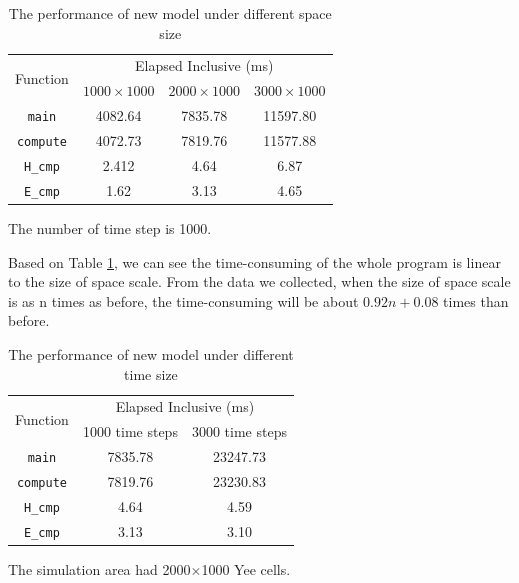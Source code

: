 \begin{table}[hp]
	\centering
	\begin{threeparttable}
	\caption{The performance of new model under different space size}\label{ch3: new, size}
		\begin{tabular}{cccc}
			\toprule
			\multirow{2}{3em}{Function}&\multicolumn{3}{c}{Elapsed Inclusive (ms)}\\ 
			\cline{2-4}
			& $1000\times1000$ & $2000\times1000$ & $3000\times1000$\\ 
			
			\midrule
			\lstinline|main| & 4082.64 & 7835.78 & 11597.80 \\ 
			\lstinline|compute| & 4072.73 & 7819.76 & 11577.88\\ 
			\lstinline|H_cmp|& 2.412 & 4.64 & 6.87\\ 
			\lstinline|E_cmp|& 1.62 & 3.13 & 4.65 \\
			\bottomrule
		\end{tabular}
		\begin{tablenotes}
			\item[1] The number of time step is 1000.
		\end{tablenotes}
	\end{threeparttable}
\end{table}

Based on Table \ref{ch3: new, size}, we can see the time-consuming of the whole program is linear to the size of space scale. From the data we collected, when the size of space scale is as n times as before, the time-consuming will be about $0.92n+0.08$ times than before.

\begin{table}[hp]
	\centering
	\begin{threeparttable}
		\caption{The performance of new model under different time size}\label{ch3: new, time}
		\begin{tabular}{ccc}
			\toprule
			\multirow{2}{3em}{Function}&\multicolumn{2}{c}{Elapsed Inclusive (ms)}\\ 
			\cline{2-3}
			& 1000 time steps & 3000 time steps\\ 
			
			\midrule
			\lstinline|main| & 7835.78 & 23247.73 \\ 
			\lstinline|compute| & 7819.76 & 23230.83\\ 
			\lstinline|H_cmp|& 4.64 & 4.59\\ 
			\lstinline|E_cmp|& 3.13 & 3.10\\
			\bottomrule
		\end{tabular}
		\begin{tablenotes}
			\item[1] The simulation area had 2000$\times$1000 Yee cells.
		\end{tablenotes}
	\end{threeparttable}
\end{table}

